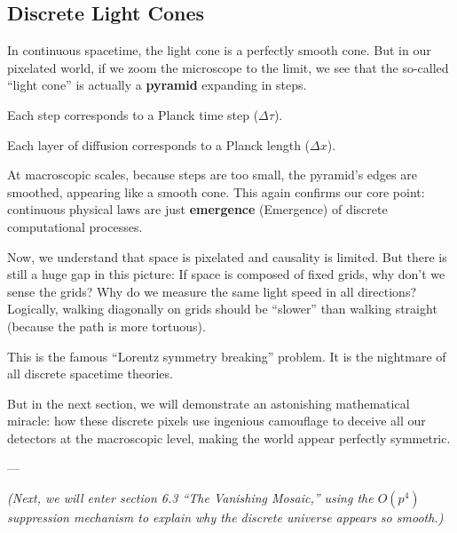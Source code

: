 \subsection{Discrete Light Cones}

In continuous spacetime, the light cone is a perfectly smooth cone. But in our pixelated world, if we zoom the microscope to the limit, we see that the so-called ``light cone'' is actually a \textbf{pyramid} expanding in steps.

Each step corresponds to a Planck time step ($\Delta\tau$).

Each layer of diffusion corresponds to a Planck length ($\Delta x$).

At macroscopic scales, because steps are too small, the pyramid's edges are smoothed, appearing like a smooth cone. This again confirms our core point: continuous physical laws are just \textbf{emergence} (Emergence) of discrete computational processes.

Now, we understand that space is pixelated and causality is limited. But there is still a huge gap in this picture: If space is composed of fixed grids, why don't we sense the grids? Why do we measure the same light speed in all directions? Logically, walking diagonally on grids should be ``slower'' than walking straight (because the path is more tortuous).

This is the famous ``Lorentz symmetry breaking'' problem. It is the nightmare of all discrete spacetime theories.

But in the next section, we will demonstrate an astonishing mathematical miracle: how these discrete pixels use ingenious camouflage to deceive all our detectors at the macroscopic level, making the world appear perfectly symmetric.

---

\textit{(Next, we will enter section 6.3 ``The Vanishing Mosaic,'' using the $O(p^4)$ suppression mechanism to explain why the discrete universe appears so smooth.)}

